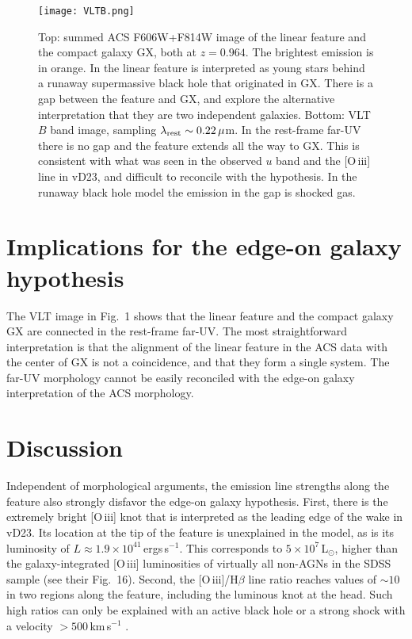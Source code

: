 \documentclass[RNAAS]{aastex62}
\begin{document}
\begin{figure}[htbp]
\begin{center}
\texttt{[image: VLTB.png]}
\caption{Top: summed ACS F606W+F814W image
of the linear feature and the compact galaxy GX, both at $z=0.964$. The brightest emission
is in orange.
In \citet{vd23} the linear feature is interpreted as young stars
behind a runaway supermassive black hole that originated in
GX. There is a gap
between the feature and GX, and \citet{s23} explore the alternative
interpretation that they are two independent galaxies.
Bottom: VLT $B$ band image, sampling $\lambda_{\rm rest}\sim 0.22\,\mu$m. In the rest-frame
far-UV there is no gap and the feature extends all the way to GX. This is consistent with
what was seen in the observed $u$ band and the [O\,{\sc iii}] line in
vD23, and difficult to reconcile with the
\citet{s23} hypothesis. In the runaway
black hole model the emission in the gap is shocked gas.}
\end{center}
\end{figure}

\section{Implications for the edge-on galaxy hypothesis}

The VLT image in Fig.\ 1
shows that the linear feature and the
compact galaxy GX are connected in the rest-frame far-UV. The most straightforward
interpretation is that the alignment of the linear feature in the ACS data
with the center of GX is not a coincidence, and that they form a single system.
The far-UV morphology cannot be easily reconciled with the edge-on galaxy interpretation of the ACS morphology.


\section{Discussion}

Independent of morphological arguments, the emission line strengths
along the feature also strongly disfavor the
edge-on galaxy hypothesis. First, there is the extremely bright 
[O\,{\sc iii}] knot that is interpreted as the leading edge of the wake in vD23.
Its location at the tip of the feature is unexplained in the \citet{s23} 
model, as is its luminosity of
$L\approx 1.9\times 10^{41}$\,ergs\,s$^{-1}$. This corresponds to $5\times 10^7$\,L$_{\odot}$,
higher than the galaxy-integrated [O\,{\sc iii}] luminosities of virtually
all non-AGNs in the \citet{kewley:06} SDSS sample (see their Fig.\ 16).
Second, the [O\,{\sc iii}]/H$\beta$
line ratio reaches values of $\sim 10$ in two regions along the feature, including
the luminous knot at the head. Such high ratios
can only be explained with an active black hole or a strong shock with a velocity
$>500$\,km\,s$^{-1}$ \citep[see][and vD23]{allen:08}. 
\end{document}
